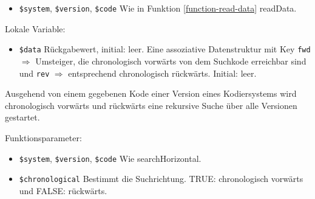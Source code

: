 \begin{itemize}
\item \texttt{\$system}, \texttt{\$version}, \texttt{\$code} \newline 
Wie in Funktion \ref{function-read-data} readData.
\end{itemize}

Lokale Variable:

\begin{itemize}
\item \texttt{\$data} \hspace{2em} Rückgabewert, initial: leer.
\newline Eine assoziative Datenstruktur mit Key \texttt{fwd} $\Rightarrow$ Umsteiger, die chronologisch vorwärts von dem Suchkode erreichbar sind und \texttt{rev} $\Rightarrow$ entsprechend chronologisch rückwärts. Initial: leer. \\
\end{itemize}

{
}

Ausgehend von einem gegebenen Kode einer Version eines Kodiersystems wird chronologisch vorwärts und rückwärts eine rekursive Suche über alle Versionen gestartet. 



Funktionsparameter:

\begin{itemize}
\item \texttt{\$system}, \texttt{\$version}, \texttt{\$code} \newline Wie searchHorizontal. 
\item \texttt{\$chronological}
\newline Bestimmt die Suchrichtung. TRUE: chronologisch vorwärts und FALSE: rückwärts. 
\end{itemize}

